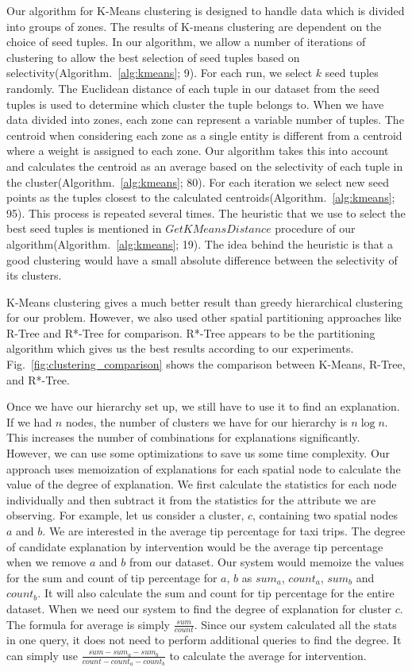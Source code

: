 Our algorithm for K-Means clustering is designed to handle data which is divided into groups of zones. The results of K-means clustering are dependent on the choice of seed tuples. In our algorithm, we allow a number of iterations of clustering to allow the best selection of seed tuples based on selectivity(Algorithm.~\ref{alg:kmeans}; 9). For each run, we select $k$ seed tuples randomly. The Euclidean distance of each tuple in our dataset from the seed tuples is used to determine which cluster the tuple belongs to. When we have data divided into zones, each zone can represent a variable number of tuples. The centroid when considering each zone as a single entity is different from a centroid where a weight is assigned to each zone. Our algorithm takes this into account and calculates the centroid as an average based on the selectivity of each tuple in the cluster(Algorithm.~\ref{alg:kmeans}; 80). For each iteration we select new seed points as the tuples closest to the calculated centroids(Algorithm.~\ref{alg:kmeans}; 95). This process is repeated several times. The heuristic that we use to select the best seed tuples is mentioned in $GetKMeansDistance$ procedure of our algorithm(Algorithm.~\ref{alg:kmeans}; 19). The idea behind the heuristic is that a good clustering would have a small absolute difference between the selectivity of its clusters.

K-Means clustering gives a much better result than greedy hierarchical clustering for our problem. However, we also used other spatial partitioning approaches like R-Tree and R*-Tree for comparison. R*-Tree appears to be the partitioning algorithm which gives us the best results according to our experiments. Fig.~\ref{fig:clustering_comparison} shows the comparison between K-Means, R-Tree, and R*-Tree.

Once we have our hierarchy set up, we still have to use it to find an explanation. If we had $n$ nodes, the number of clusters we have for our hierarchy is $n \log n$.  This increases the number of combinations for explanations significantly. However, we can use some optimizations to save us some time complexity. Our approach uses memoization of explanations for each spatial node to calculate the value of the degree of explanation. We first calculate the statistics for each node individually and then subtract it from the statistics for the attribute we are observing. For example, let us consider a cluster, $c$, containing two spatial nodes $a$ and $b$. We are interested in the average tip percentage for taxi trips. The degree of candidate explanation by intervention would be the average tip percentage when we remove $a$ and $b$ from our dataset. Our system would memoize the values for the sum and count of tip percentage for $a$, $b$ as $sum_a$, $count_a$, $sum_b$ and $count_b$. It will also calculate the sum and count for tip percentage for the entire dataset. When we need our system to find the degree of explanation for cluster $c$. The formula for average is simply $\frac{sum}{count}$. Since our system calculated all the stats in one query, it does not need to perform additional queries to find the degree. It can simply use $\frac{sum-sum_a-sum_b}{count-count_a-count_b}$ to calculate the average for intervention.


